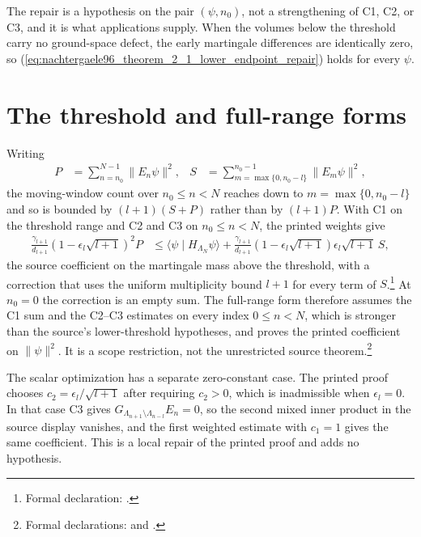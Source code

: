 \documentclass{article}
\begin{document}
The repair is a hypothesis on the pair $(\psi,n_0)$, not a strengthening of
C1, C2, or C3, and it is what applications supply. When the volumes below
the threshold carry no ground-space defect, the early martingale differences
are identically zero, so
(\ref{eq:nachtergaele96_theorem_2_1_lower_endpoint_repair}) holds for every
$\psi$.

\section{The threshold and full-range forms}

Writing
\begin{align}
    P
     & =\sum_{n=n_0}^{N-1}\lVert E_n\psi\rVert^2,
     &
    S
     & =\sum_{m=\max\{0,n_0-l\}}^{n_0-1}\lVert E_m\psi\rVert^2,
    \label{eq:nachtergaele96_theorem_2_1_lower_endpoint_masses}
\end{align}
the moving-window count over $n_0\leq n<N$ reaches down to
$m=\max\{0,n_0-l\}$ and so is bounded by $(l+1)(S+P)$ rather than by
$(l+1)P$. With C1 on the threshold range and C2 and C3 on $n_0\leq n<N$, the
printed weights give
\begin{align}
    \frac{\gamma_{l+1}}{d_{l+1}}
    \left(1-\epsilon_l\sqrt{l+1}\right)^2P
     & \leq
    \langle\psi\mid H_{\Lambda_N}\psi\rangle
    +\frac{\gamma_{l+1}}{d_{l+1}}
    \left(1-\epsilon_l\sqrt{l+1}\right)\epsilon_l\sqrt{l+1}\,S,
    \label{eq:nachtergaele96_theorem_2_1_lower_endpoint_threshold_form}
\end{align}
the source coefficient on the martingale mass above the threshold, with a
correction that uses the uniform multiplicity bound $l+1$ for every term of
$S$.\footnote{Formal declaration:
    .}
At $n_0=0$ the correction is an empty sum. The full-range form therefore
assumes the C1 sum and the C2--C3 estimates on every index $0\leq n<N$, which
is stronger than the source's lower-threshold hypotheses, and proves the
printed coefficient on $\lVert\psi\rVert^2$. It is a scope restriction, not
the unrestricted source theorem.\footnote{Formal declarations:
    and
    .}

The scalar optimization has a separate zero-constant case. The printed proof
chooses $c_2=\epsilon_l/\sqrt{l+1}$ after requiring $c_2>0$, which is
inadmissible when $\epsilon_l=0$. In that case C3 gives
$G_{\Lambda_{n+1}\setminus\Lambda_{n-l}}E_n=0$, so the second mixed inner
product in the source display  vanishes, and the first weighted
estimate with $c_1=1$ gives the same coefficient. This is a local repair of
the printed proof and adds no hypothesis.
\end{document}

